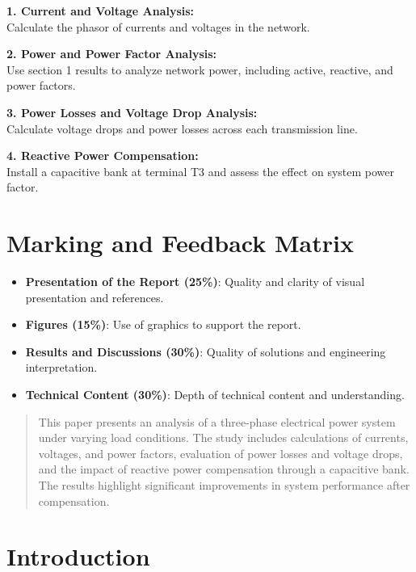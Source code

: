 \documentclass[conference]{IEEEtran}
\begin{document}
\vspace{1cm}
\noindent\textbf{1. Current and Voltage Analysis:} \\
Calculate the phasor of currents and voltages in the network.

\vspace{0.5cm}
\noindent\textbf{2. Power and Power Factor Analysis:} \\
Use section 1 results to analyze network power, including active, reactive, and power factors.

\vspace{0.5cm}
\noindent\textbf{3. Power Losses and Voltage Drop Analysis:} \\
Calculate voltage drops and power losses across each transmission line.

\vspace{0.5cm}
\noindent\textbf{4. Reactive Power Compensation:} \\
Install a capacitive bank at terminal T3 and assess the effect on system power factor.

\vspace{1cm}
\section*{Marking and Feedback Matrix}
\begin{itemize}
    \item \textbf{Presentation of the Report (25\%)}: Quality and clarity of visual presentation and references.
    \item \textbf{Figures (15\%)}: Use of graphics to support the report.
    \item \textbf{Results and Discussions (30\%)}: Quality of solutions and engineering interpretation.
    \item \textbf{Technical Content (30\%)}: Depth of technical content and understanding.
\end{itemize}

 
\newpage
\begin{abstract}
This paper presents an analysis of a three-phase electrical power system under varying load conditions. The study includes calculations of currents, voltages, and power factors, evaluation of power losses and voltage drops, and the impact of reactive power compensation through a capacitive bank. The results highlight significant improvements in system performance after compensation.
\end{abstract}

\section{Introduction}
\end{document}
